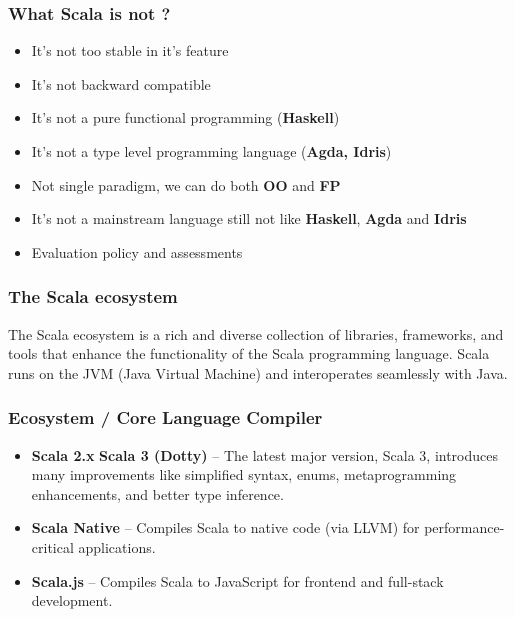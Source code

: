 \documentclass{beamer}
\begin{document}

\begin{frame}
\frametitle{What Scala is not ? }

\begin{itemize}
    \item It's not too stable in it's feature
    \item It's not backward compatible
    \item It's not a pure functional programming (\textbf{Haskell})
    \item It's not a type level programming language (\textbf{Agda, Idris})
    \item Not single paradigm, we can do both \textbf{OO} and \textbf{FP} 
    \item It's not a mainstream language still not like \textbf{Haskell}, \textbf{Agda} and \textbf{Idris}
    \item Evaluation policy and assessments
\end{itemize}
\end{frame}



\begin{frame}
\frametitle{The Scala ecosystem }

The Scala ecosystem is a rich and diverse collection of libraries, frameworks, and tools that enhance the functionality of the Scala programming language. Scala runs on the JVM (Java Virtual Machine) and interoperates seamlessly with Java.

\end{frame}


\begin{frame}
\frametitle{Ecosystem / Core Language \text{\&} Compiler }

\begin{itemize}
    \item \textbf{Scala 2.x} \text{\&} \textbf{Scala 3 (Dotty)} – The latest major version, Scala 3, introduces many improvements like simplified syntax, enums, metaprogramming enhancements, and better type inference.
    \item \textbf{Scala Native} – Compiles Scala to native code (via LLVM) for performance-critical applications.
    \item \textbf{Scala.js} – Compiles Scala to JavaScript for frontend and full-stack development.
\end{itemize}

\end{frame}
\end{document}
